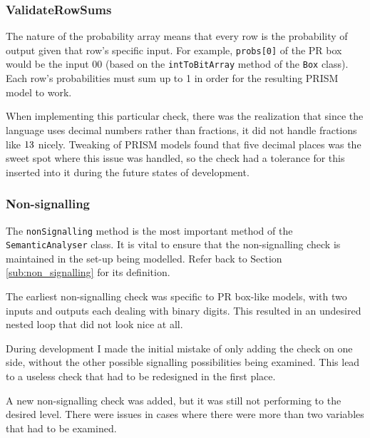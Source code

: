 \documentclass[report.tex]{subfiles}
\begin{document}
\subsubsection{ValidateRowSums} %
\label{ssub:validaterowsums}
The nature of the probability array means that every row is the probability of
output given that row's specific input. For example, \texttt{probs[0]} of the
PR box would be the input 00 (based on the \texttt{intToBitArray} method of the
\texttt{Box} class). Each row's probabilities must sum up to 1 in order for the
resulting PRISM model to work.

When implementing this particular check, there was the realization that since
the language uses decimal numbers rather than fractions, it did not handle
fractions like \(1\\3\) nicely. Tweaking of PRISM models found that five
decimal places was the sweet spot where this issue was handled, so the check
had a tolerance for this inserted into it during the future states of
development.
\newpage
\subsubsection{Non-signalling} %
\label{ssub:non_signalling}
The \texttt{nonSignalling} method is the most important method of the
\texttt{SemanticAnalyser} class. It is vital to ensure that the non-signalling
check is maintained in the set-up being modelled. Refer back to Section
\ref{sub:non_signalling} for its definition.

The earliest non-signalling check was specific to PR box-like models, with two
inputs and outputs each dealing with binary digits. This resulted in an
undesired nested loop that did not look nice at all.



During development I made the initial mistake of only adding the check on one
side, without the other possible signalling possibilities being examined. This
lead to a useless check that had to be redesigned in the first place.

A new non-signalling check was added, but it was still not performing to the
desired level. There were issues in cases where there were more than two
variables that had to be examined.
\end{document}
